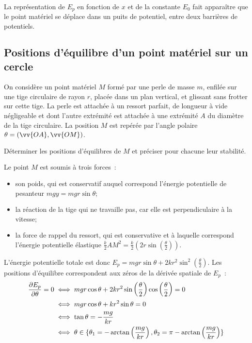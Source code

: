 La représentation de \(E_p\) en fonction de \(x\) et de la constante \(E_0\) fait apparaître que le point matériel se déplace dans un puits de potentiel, entre deux barrières de potentiels.

\subsection{Positions d'équilibre d'un point matériel sur un cercle}
\label{chap4-subsec:positionsdequilibredunpointsuruncercle}

On considère un point matériel \(M\) formé par une perle de masse \(m\), enfilée sur une tige circulaire de rayon \(r\), placée dans un plan vertical, et glissant sans frotter sur cette tige. La perle est attachée à un ressort parfait, de longueur à vide négligeable et dont l'autre extrémité est attachée à une extrémité \(A\) du diamètre de la tige circulaire. La position \(M\) est repérée par l'angle polaire \(\theta = (\vv{OA}, \vv{OM})\).

Déterminer les positions d'équilibres de \(M\) et préciser pour chacune leur stabilité.

Le point \(M\) est soumis à trois forces~:
\begin{itemize}
\item son poids, qui est conservatif auquel correspond l'énergie potentielle de pesanteur \(mgy=mgr\sin\theta\);
\item la réaction de la tige qui ne travaille pas, car elle est perpendiculaire à la vitesse;
\item la force de rappel du ressort, qui est conservative et à laquelle correspond l'énergie potentielle élastique \(\frac{k}{2}AM^2=\frac{k}{2}\left(2r\sin\left(\frac{\theta}{2}\right)\right)\).
\end{itemize}

L'énergie potentielle totale est donc \(E_p = mgr \sin\theta + 2kr^2 \sin^2\left(\frac{\theta}{2}\right)\). Les positions d'équilibre correspondent aux zéros de la dérivée spatiale de \(E_p\)~:
\begin{align}
  \dfrac{\partial E_p}{\partial \theta} = 0 &\iff mgr\cos\theta +2kr^2 \sin\left(\frac{\theta}{2}\right) \cos\left(\frac{\theta}{2}\right)=0 \\
  & \iff mgr\cos\theta + kr^2 \sin\theta=0 \\
  & \iff \tan\theta = -\frac{mg}{kr} \\
  & \iff \theta \in \{\theta_1=-\arctan \left( \frac{mg}{kr} \right), \theta_2=\pi-\arctan \left( \frac{mg}{kr} \right)\}
\end{align}

